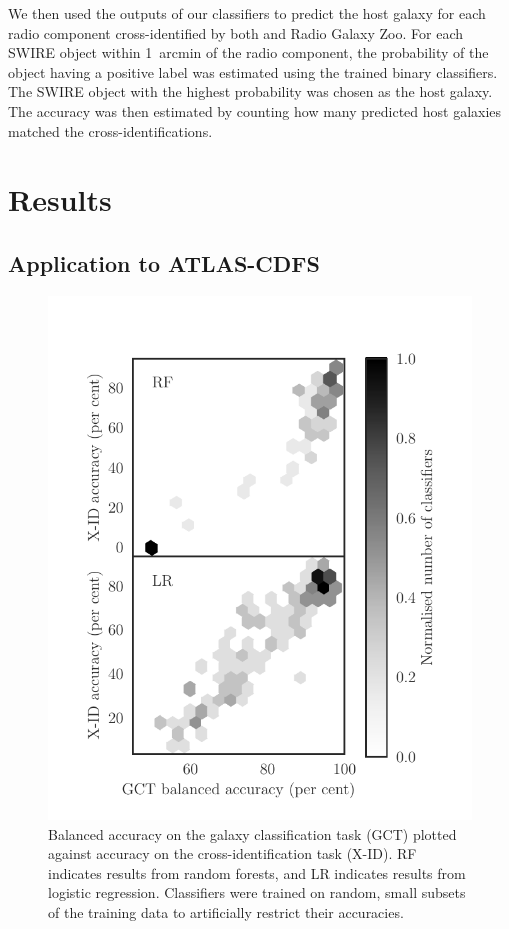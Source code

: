 \documentclass[fleqn,usenatbib,usedcolumn]{mnras}
\begin{document}
    We then used the outputs of our classifiers to predict the host galaxy for
    each radio component cross-identified by both \citet{norris06} and Radio
    Galaxy Zoo. For each SWIRE object within 1~arcmin of the radio component,
    the probability of the object having a positive label was estimated using
    the trained binary classifiers. The SWIRE object with the highest
    probability was chosen as the host galaxy. The accuracy was then estimated
    by counting how many predicted host galaxies matched the \citet{norris06}
    cross-identifications.

\section{Results}\label{sec:results}
  \subsection{Application to ATLAS-CDFS}

    \begin{figure}
      \centering
      \includegraphics[width=\columnwidth]{gct-to-xid.pdf}
      \caption{Balanced accuracy on the galaxy classification task (GCT) plotted
      against accuracy on the cross-identification task (X-ID). RF indicates
      results from random forests, and LR indicates results from logistic
      regression. Classifiers were trained on random, small subsets of the
      training data to artificially restrict their accuracies.
      \label{fig:gct-to-xid}}
    \end{figure}
\end{document}
